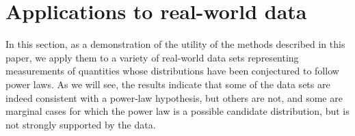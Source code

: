 \documentclass[final]{siamltex}
\begin{document}

\section{Applications to real-world data}
\label{sec:results}

In this section, as a demonstration of the utility of the methods described
in this paper, we apply them to a variety of real-world data sets
representing measurements of quantities whose distributions have been
conjectured to follow power laws.  As we will see, the results indicate
that some of the data sets are indeed consistent with a power-law
hypothesis, but others are not, and some are marginal cases for which the
power law is a possible candidate distribution, but is not strongly
supported by the data.
\end{document}

